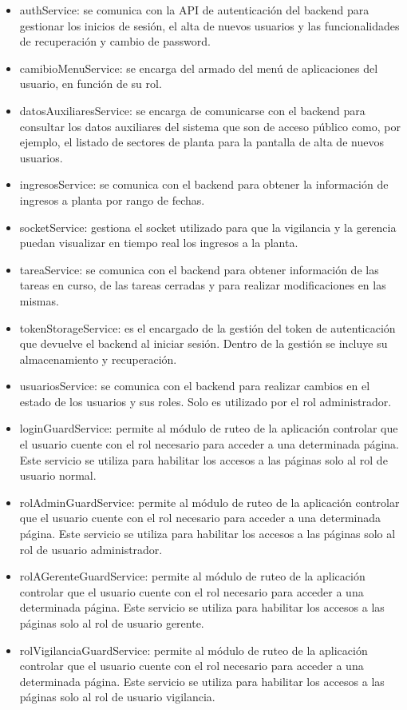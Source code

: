 \begin{itemize}
\item authService: se comunica con la API de autenticación del backend para gestionar los inicios de sesión, el alta de nuevos usuarios y las funcionalidades de recuperación y cambio de password.
\item camibioMenuService: se encarga del armado del menú de aplicaciones del usuario, en función de su rol. 
\item datosAuxiliaresService: se encarga de comunicarse con el backend para consultar los datos auxiliares del sistema que son de acceso público como, por ejemplo, el listado de sectores de planta para la pantalla de alta de nuevos usuarios.
\item ingresosService: se comunica con el backend para obtener la información de ingresos a planta por rango de fechas.
\item socketService: gestiona el socket utilizado para que la vigilancia y la gerencia puedan visualizar en tiempo real los ingresos a la planta.
\item tareaService: se comunica con el backend para obtener información de las tareas en curso, de las tareas cerradas y para realizar modificaciones en las mismas.
\item tokenStorageService: es el encargado de la gestión del token de autenticación que devuelve el backend al iniciar sesión. Dentro de la gestión se incluye su almacenamiento y recuperación.
\item usuariosService: se comunica con el backend para realizar cambios en el estado de los usuarios y sus roles. Solo es utilizado por el rol administrador. 
\item loginGuardService: permite al módulo de ruteo de la aplicación controlar que el usuario cuente con el rol necesario para acceder a una determinada página. Este servicio se utiliza para habilitar los accesos a las páginas solo al rol de usuario normal.
\item rolAdminGuardService: permite al módulo de ruteo de la aplicación controlar que el usuario cuente con el rol necesario para acceder a una determinada página. Este servicio se utiliza para habilitar los accesos a las páginas solo al rol de usuario administrador.
\item rolAGerenteGuardService: permite al módulo de ruteo de la aplicación controlar que el usuario cuente con el rol necesario para acceder a una determinada página. Este servicio se utiliza para habilitar los accesos a las páginas solo al rol de usuario gerente.
\item rolVigilanciaGuardService: permite al módulo de ruteo de la aplicación controlar que el usuario cuente con el rol necesario para acceder a una determinada página. Este servicio se utiliza para habilitar los accesos a las páginas solo al rol de usuario vigilancia.
\end{itemize}


